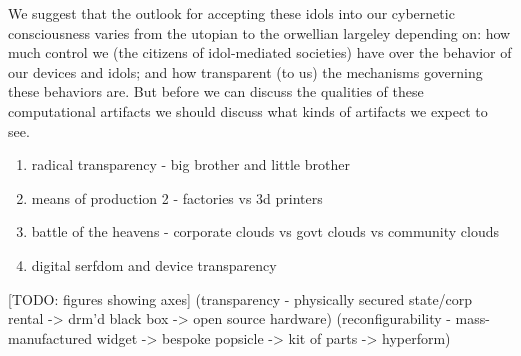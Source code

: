 We suggest that the outlook for accepting these idols into our cybernetic consciousness varies from the utopian to the orwellian largeley depending on: how much control we (the citizens of idol-mediated societies) have over the behavior of our devices and idols; and how transparent (to us) the mechanisms governing these behaviors are. But before we can discuss the qualities of these computational artifacts we should discuss what kinds of artifacts we expect to see.

    \begin{enumerate}
        \item radical transparency - big brother and little brother
        \item means of production 2 - factories vs 3d printers
        \item battle of the heavens - corporate clouds vs govt clouds vs community clouds
        \item digital serfdom and device transparency
    \end{enumerate}
    
    [TODO: figures showing axes] (transparency - physically secured state/corp rental -> drm'd black box -> open source hardware) (reconfigurability - mass-manufactured widget -> bespoke popsicle -> kit of parts -> hyperform)
